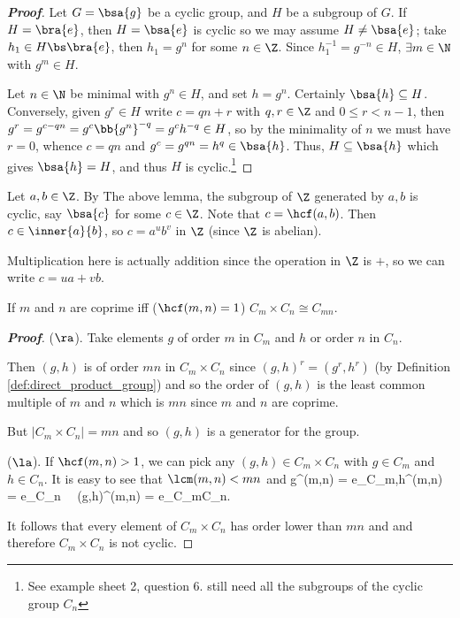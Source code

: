 \begin{proof}[\bf Proof]
Let $G = \bsa{g}$ be a cyclic group, and $H$ be a subgroup of $G$. If $H = \bra{e}$, then $H=\bsa{e}$ is cyclic so we may assume $H \neq \bsa{e}$; take $h_1\in H\bs \bra{e}$, then $h_1 = g^n$ for some $n \in \Z$. Since $h_1^{-1} = g^{-n} \in H$, $\exists m\in \N$ with $g^m \in H$.

Let $n\in \N$ be minimal with $g^n \in H$, and set $h = g^n$. Certainly $\bsa{h}\subseteq H$. Conversely, given $g^r\in H$ write $c = qn + r$ with $q,r\in \Z$ and $0\leq r < n-1$, then $g^r = g^{c -qn} = g^c \bb{g^n}^{-q} = g^c h^{-q} \in H$, so by the minimality of $n$ we must have $r=0$, whence $c = qn$ and $g^c = g^{qn} = h^q \in \bsa{h}$. Thus, $H\subseteq \bsa{h}$ which gives $\bsa{h} = H$, and thus $H$ is cyclic.\footnote{See example sheet 2, question 6. still need all the subgroups of the cyclic group $C_n$}
\end{proof}

\begin{remark}
Let $a,b\in \Z$. By The above lemma, the subgroup of $\Z$ generated by $a,b$ is cyclic, say $\bsa{c}$ for some $c\in\Z$. Note that $c= \hcf(a,b)$. Then $c\in \inner{a}{b}$, so $c = a^u b^v$ in $\Z$ (since $\Z$ is abelian).
\end{remark}

\begin{remark}
Multiplication here is actually addition since the operation in $\Z$ is $+$, so we can write $c = ua + vb$.
\end{remark}


\begin{lemma}\label{lem:coprime_cong_cyclic_group}
If $m$ and $n$ are coprime iff ($\hcf(m,n) = 1$) $C_m \times C_n \cong C_{mn}$.
\end{lemma}

\begin{proof}[\bf Proof]
($\ra$). Take elements $g$ of order $m$ in $C_m$ and $h$ or order $n$ in $C_n$.

Then $(g, h)$ is of order $mn$ in $C_m \times C_n$ since $(g, h)^r = (g^r, h^r)$ (by Definition \ref{def:direct_product_group}) and so the order of $(g, h)$ is the least common multiple of $m$ and $n$ which is $mn$ since $m$ and $n$ are coprime.

But $|C_m \times C_n| = mn$ and so $(g, h)$ is a generator for the group.

($\la$). If $\hcf(m,n) >1$, we can pick any $(g,h) \in C_{m}\times C_n$ with $g\in C_m$ and $h\in C_n$. It is easy to see that $\lcm(m,n) < mn$ and
\be
g^{\lcm(m,n)} = e_{C_m},\qquad h^{\lcm(m,n)} = e_{C_n} \ \ra\ (g,h)^{\lcm(m,n)} = e_{C_m\times C_n}.
\ee 

It follows that every element of $C_m\times C_n$ has order lower than $mn$ and and therefore $C_m\times C_n$ is not cyclic.
\end{proof}

